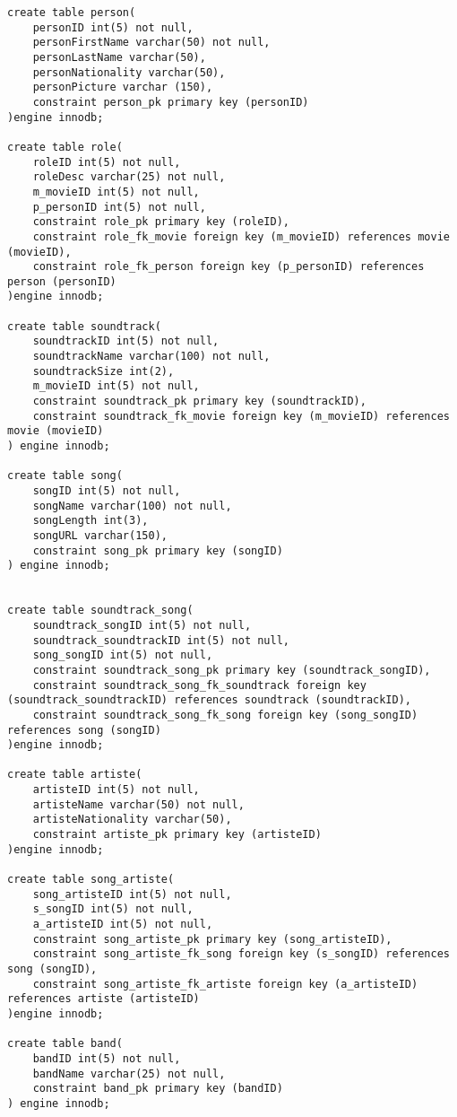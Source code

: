 \documentclass[12pt]{article}
\begin{document}
\begin{lstlisting}
create table person(
    personID int(5) not null,
    personFirstName varchar(50) not null,
    personLastName varchar(50),
    personNationality varchar(50),
    personPicture varchar (150),
    constraint person_pk primary key (personID)
)engine innodb;

create table role(
    roleID int(5) not null,
    roleDesc varchar(25) not null,
    m_movieID int(5) not null,
    p_personID int(5) not null,
    constraint role_pk primary key (roleID),
    constraint role_fk_movie foreign key (m_movieID) references movie (movieID),
    constraint role_fk_person foreign key (p_personID) references person (personID)
)engine innodb;

create table soundtrack(
    soundtrackID int(5) not null,
    soundtrackName varchar(100) not null,
    soundtrackSize int(2),
    m_movieID int(5) not null,
    constraint soundtrack_pk primary key (soundtrackID),
    constraint soundtrack_fk_movie foreign key (m_movieID) references movie (movieID)
) engine innodb;

create table song(
    songID int(5) not null,
    songName varchar(100) not null,
    songLength int(3),
    songURL varchar(150),
    constraint song_pk primary key (songID)
) engine innodb;


create table soundtrack_song(
    soundtrack_songID int(5) not null,
    soundtrack_soundtrackID int(5) not null,
    song_songID int(5) not null,
    constraint soundtrack_song_pk primary key (soundtrack_songID),
    constraint soundtrack_song_fk_soundtrack foreign key (soundtrack_soundtrackID) references soundtrack (soundtrackID),
    constraint soundtrack_song_fk_song foreign key (song_songID) references song (songID)
)engine innodb;

create table artiste(
    artisteID int(5) not null,
    artisteName varchar(50) not null,
    artisteNationality varchar(50),
    constraint artiste_pk primary key (artisteID)
)engine innodb;

create table song_artiste(
    song_artisteID int(5) not null,
    s_songID int(5) not null,
    a_artisteID int(5) not null,
    constraint song_artiste_pk primary key (song_artisteID),
    constraint song_artiste_fk_song foreign key (s_songID) references song (songID),
    constraint song_artiste_fk_artiste foreign key (a_artisteID) references artiste (artisteID)
)engine innodb;

create table band(
    bandID int(5) not null,
    bandName varchar(25) not null,
    constraint band_pk primary key (bandID)
) engine innodb;


\end{lstlisting}
\end{document}
